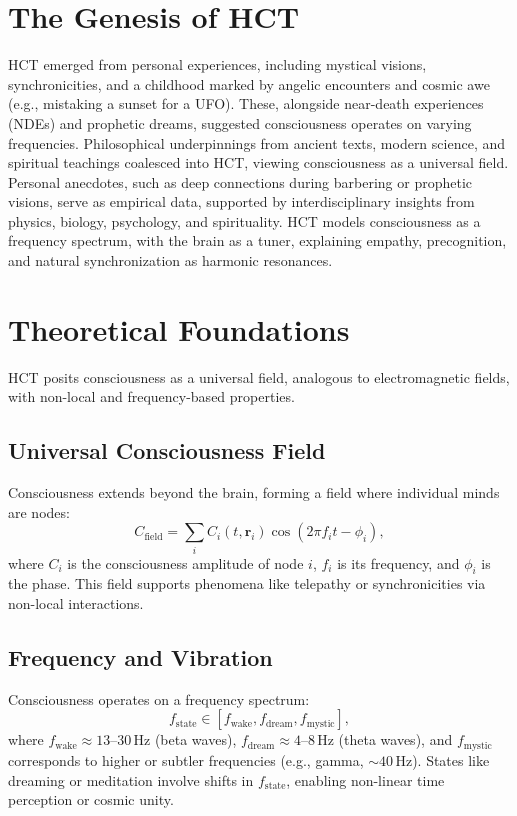 \documentclass[a4paper,12pt]{article}
\begin{document}
\section{The Genesis of HCT}
\label{sec:genesis}
HCT emerged from personal experiences, including mystical visions, synchronicities, and a childhood marked by angelic encounters and cosmic awe (e.g., mistaking a sunset for a UFO). These, alongside near-death experiences (NDEs) and prophetic dreams, suggested consciousness operates on varying frequencies. Philosophical underpinnings from ancient texts, modern science, and spiritual teachings coalesced into HCT, viewing consciousness as a universal field. Personal anecdotes, such as deep connections during barbering or prophetic visions, serve as empirical data, supported by interdisciplinary insights from physics, biology, psychology, and spirituality. HCT models consciousness as a frequency spectrum, with the brain as a tuner, explaining empathy, precognition, and natural synchronization as harmonic resonances.

\section{Theoretical Foundations}
\label{sec:theory}
HCT posits consciousness as a universal field, analogous to electromagnetic fields, with non-local and frequency-based properties.

\subsection{Universal Consciousness Field}
Consciousness extends beyond the brain, forming a field where individual minds are nodes:
\begin{equation}
C_{\text{field}} = \sum_i C_i(t, \mathbf{r}_i) \cos(2\pi f_i t - \phi_i),
\label{eq:field}
\end{equation}
where $C_i$ is the consciousness amplitude of node $i$, $f_i$ is its frequency, and $\phi_i$ is the phase. This field supports phenomena like telepathy or synchronicities via non-local interactions.

\subsection{Frequency and Vibration}
Consciousness operates on a frequency spectrum:
\begin{equation}
f_{\text{state}} \in [f_{\text{wake}}, f_{\text{dream}}, f_{\text{mystic}}],
\label{eq:freq_spectrum}
\end{equation}
where $f_{\text{wake}} \approx 13\text{--}30 \, \text{Hz}$ (beta waves), $f_{\text{dream}} \approx 4\text{--}8 \, \text{Hz}$ (theta waves), and $f_{\text{mystic}}$ corresponds to higher or subtler frequencies (e.g., gamma, $\sim 40 \, \text{Hz}$). States like dreaming or meditation involve shifts in $f_{\text{state}}$, enabling non-linear time perception or cosmic unity.
\end{document}
